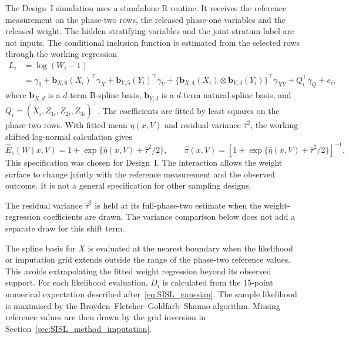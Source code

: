 The Design~I simulation uses a standalone R routine. It receives the reference measurement on the phase-two rows, the released phase-one variables and the released weight. The hidden stratifying variables and the joint-stratum label are not inputs. The conditional inclusion function is estimated from the selected rows through the working regression
\begin{equation}
\begin{aligned}
L_i
&= \log(W_i-1) \\
&= \gamma_0
 + \mathbf b_{X,6}(X_i)^\top\gamma_X
 + \mathbf b_{Y,5}(Y_i)^\top\gamma_Y
 + \{\mathbf b_{X,4}(X_i)\otimes\mathbf b_{Y,3}(Y_i)\}^\top\gamma_{XY}
 + Q_i^\top\gamma_Q + e_i,
\end{aligned}
\label{eq:SISL_weight_model}
\end{equation}
where $\mathbf b_{X,d}$ is a $d$-term B-spline basis, $\mathbf b_{Y,d}$ is a $d$-term natural-spline basis, and $Q_i=(\tilde X_i,Z_{1i},Z_{2i},Z_{3i})^\top$. The coefficients are fitted by least squares on the phase-two rows. With fitted mean $\hat\eta(x,V)$ and residual variance $\hat\tau^2$, the working shifted log-normal calculation gives
\begin{equation}
\widehat E_s(W\mid x,V)
=1+\exp\{\hat\eta(x,V)+\hat\tau^2/2\},
\qquad
\hat\pi(x,V)
=\left[1+\exp\{\hat\eta(x,V)+\hat\tau^2/2\}\right]^{-1}.
\label{eq:SISL_weight_surface}
\end{equation}
This specification was chosen for Design~I. The interaction allows the weight surface to change jointly with the reference measurement and the observed outcome. It is not a general specification for other sampling designs.

The residual variance $\hat\tau^2$ is held at its full-phase-two estimate when the weight-regression coefficients are drawn. The variance comparison below does not add a separate draw for this shift term.

The spline basis for $X$ is evaluated at the nearest boundary when the likelihood or imputation grid extends outside the range of the phase-two reference values. This avoids extrapolating the fitted weight regression beyond its observed support. For each likelihood evaluation, $D_i$ is calculated from the 15-point numerical expectation described after~\eqref{eq:SISL_gaussian}. The sample likelihood is maximised by the Broyden--Fletcher--Goldfarb--Shanno algorithm. Missing reference values are then drawn by the grid inversion in Section~\ref{sec:SISL_method_imputation}.

